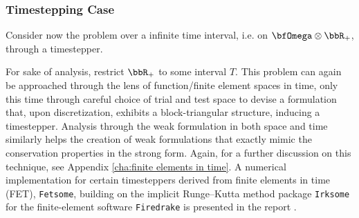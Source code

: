 \subsubsection*{Timestepping Case}
    
    Consider now the problem over a infinite time interval, i.e. on $\bfOmega\otimes\bbR_{+}$, through a timestepper.
    
     For sake of analysis, restrict $\bbR_{+}$ to some interval $T$. This problem can again be approached through the lens of function/finite element spaces in time, only this time through careful choice of trial and test space to devise a formulation that, upon discretization, exhibits a block-triangular structure, inducing a timestepper. Analysis through the weak formulation in both space and time similarly helps the creation of weak formulations that exactly mimic the conservation properties in the strong form. Again, for a further discussion on this technique, see Appendix \ref{cha:finite elements in time}. A numerical implementation for certain timesteppers derived from finite elements in time (FET), {\tt Fetsome}, building on the implicit Runge–Kutta method package {\tt Irksome} for the finite-element software {\tt Firedrake} is presented in the report \cite{La22}.
